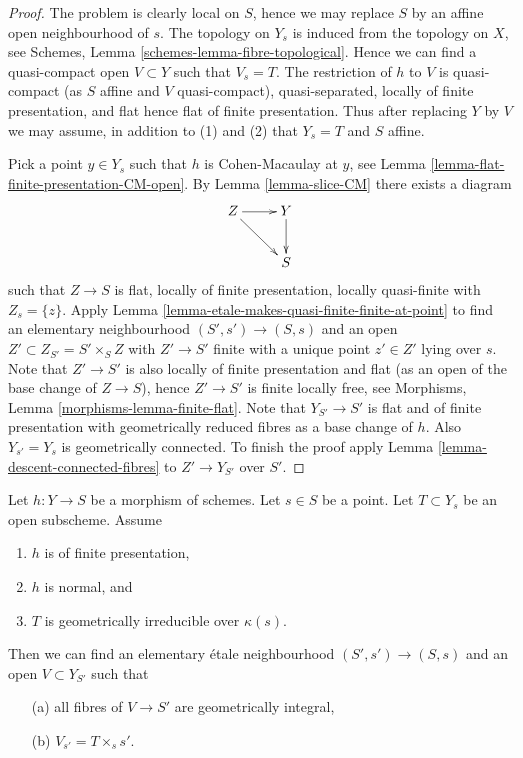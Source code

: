 \begin{proof}
The problem is clearly local on $S$, hence we may replace $S$ by an
affine open neighbourhood of $s$.
The topology on $Y_s$ is induced from the topology on $X$, see
Schemes, Lemma \ref{schemes-lemma-fibre-topological}.
Hence we can find a quasi-compact open $V \subset Y$ such that $V_s = T$.
The restriction of $h$ to $V$ is quasi-compact (as $S$ affine and $V$
quasi-compact), quasi-separated, locally of finite presentation, and
flat hence flat of finite presentation.
Thus after replacing $Y$ by $V$ we may assume, in addition
to (1) and (2) that $Y_s = T$ and $S$ affine.

\medskip\noindent
Pick a point $y \in Y_s$ such that $h$ is Cohen-Macaulay at $y$, see
Lemma \ref{lemma-flat-finite-presentation-CM-open}.
By
Lemma \ref{lemma-slice-CM}
there exists a diagram
$$
\xymatrix{
Z \ar[r] \ar[rd] & Y \ar[d] \\
& S
}
$$
such that $Z \to S$ is flat, locally of finite presentation, locally
quasi-finite with $Z_s = \{z\}$. Apply
Lemma \ref{lemma-etale-makes-quasi-finite-finite-at-point}
to find an elementary neighbourhood $(S', s') \to (S, s)$ and an open
$Z' \subset Z_{S'} = S' \times_S Z$ with $Z' \to S'$ finite with a unique
point $z' \in Z'$ lying over $s$. Note that $Z' \to S'$ is also
locally of finite presentation and flat (as an open of the base change
of $Z \to S$), hence $Z' \to S'$ is finite locally free, see
Morphisms, Lemma \ref{morphisms-lemma-finite-flat}.
Note that $Y_{S'} \to S'$ is flat and of finite presentation
with geometrically reduced fibres as a base change of $h$.
Also $Y_{s'} = Y_s$ is geometrically connected.
To finish the proof apply
Lemma \ref{lemma-descent-connected-fibres}
to $Z' \to Y_{S'}$ over $S'$.
\end{proof}

\begin{lemma}
\label{lemma-normal-morphism-irreducible}
Let $h : Y \to S$ be a morphism of schemes.
Let $s \in S$ be a point.
Let $T \subset Y_s$ be an open subscheme.
Assume
\begin{enumerate}
\item $h$ is of finite presentation,
\item $h$ is normal, and
\item $T$ is geometrically irreducible over $\kappa(s)$.
\end{enumerate}
Then we can find an elementary \'etale neighbourhood $(S', s') \to (S, s)$
and an open $V \subset Y_{S'}$ such that
\begin{enumerate}
\item[(a)] all fibres of $V \to S'$ are geometrically integral,
\item[(b)] $V_{s'} = T \times_s s'$.
\end{enumerate}
\end{lemma}

